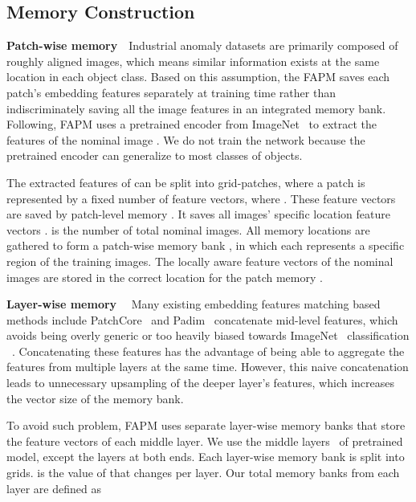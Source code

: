 \documentclass{article}
\begin{document}
 	\vspace{-0.4cm}
	\subsection{Memory Construction}
    \vspace{-0.2cm}
	\label{section2.1}
	 \textbf{Patch-wise memory}~~Industrial anomaly datasets are primarily composed of roughly aligned images, which means similar information exists at the same location in each object class. Based on this assumption, the FAPM saves each patch’s embedding features separately at training time rather than indiscriminately saving all the image features in an integrated memory bank. Following, FAPM uses a pretrained encoder from ImageNet~\cite{imagenet} to extract the features of the nominal image . We do not train the network because the pretrained encoder can generalize to most classes of objects. 

  
The extracted features of  can be split into  grid-patches, where a patch  is represented by a fixed number of  feature vectors, where . These feature vectors are saved by patch-level memory . It saves all  images' specific location feature vectors .  is the number of total nominal images. All memory locations are gathered to form a patch-wise memory bank , in which each  represents a specific region of the  training images.  The locally aware feature vectors  of the nominal images are stored in the correct location for the patch memory .



\vspace{0.2cm}
\noindent \textbf{Layer-wise memory}~~ Many existing embedding features matching based methods include PatchCore~\cite{patchcore} and Padim~\cite{Padim} concatenate mid-level features, which avoids being overly generic or too heavily biased towards ImageNet~\cite{imagenet} classification ~\cite{patchcore}. Concatenating these features has the advantage of being able to aggregate the features from multiple layers at the same time. However, this naive concatenation leads to unnecessary upsampling of the deeper layer's features, which increases the vector size of the memory bank.


 To avoid such problem, FAPM uses separate layer-wise memory banks that store the feature vectors of each middle layer. We use the middle layers~ of pretrained model, except the layers at both ends. Each layer-wise memory bank is split into  grids.  is the value of  that changes per layer. Our total memory banks from each layer are defined as 
\end{document}
